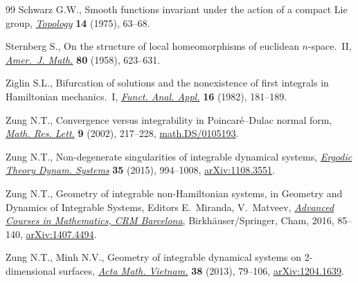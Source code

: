 \documentclass[11pt]{article}
\numberwithin{equation}{section}
\begin{document}
\begin{thebibliography}{99}
Schwarz G.W., Smooth functions invariant under the action of a compact {L}ie
 group, \href{https://doi.org/10.1016/0040-9383(75)90036-1}{\textit{Topology}} \textbf{14} (1975), 63--68.

Sternberg S., On the structure of local homeomorphisms of euclidean
 {$n$}-space.~{II}, \href{https://doi.org/10.2307/2372774}{\textit{Amer.~J. Math.}} \textbf{80} (1958), 623--631.

Ziglin S.L., Bifurcation of solutions and the nonexistence of f\/irst integrals
 in {H}amiltonian mechanics.~{I}, \href{https://doi.org/10.1007/BF01081586}{\textit{Funct. Anal. Appl.}} \textbf{16}
 (1982), 181--189.

Zung N.T., Convergence versus integrability in {P}oincar\'e--{D}ulac normal
 form, \href{http://dx.doi.org/10.4310/MRL.2002.v9.n2.a8}{\textit{Math. Res. Lett.}} \textbf{9} (2002), 217--228,
 \href{https://arxiv.org/abs/math.DS/0105193}{math.DS/0105193}.

Zung N.T., Non-degenerate singularities of integrable dynamical systems,
 \href{https://doi.org/10.1017/etds.2013.65}{\textit{Ergodic Theory Dynam. Systems}} \textbf{35} (2015), 994--1008,
 \href{https://arxiv.org/abs/1108.3551}{arXiv:1108.3551}.

Zung N.T., Geometry of integrable non-{H}amiltonian systems, in Geometry and
 Dynamics of Integrable Systems, Editors E.~Miranda, V.~Matveev, \href{https://doi.org/10.1007/978-3-319-33503-2_3}{\it Advanced
 Courses in Mathematics, CRM Barcelona}, Birkh\"auser/Springer, Cham, 2016,
 85--140, \href{https://arxiv.org/abs/1407.4494}{arXiv:1407.4494}.

Zung N.T., Minh N.V., Geometry of integrable dynamical systems on 2-dimensional
 surfaces, \href{https://doi.org/10.1007/s40306-012-0005-9}{\textit{Acta Math. Vietnam.}} \textbf{38} (2013), 79--106,
 \href{https://arxiv.org/abs/1204.1639}{arXiv:1204.1639}.

\end{thebibliography}
\end{document}
